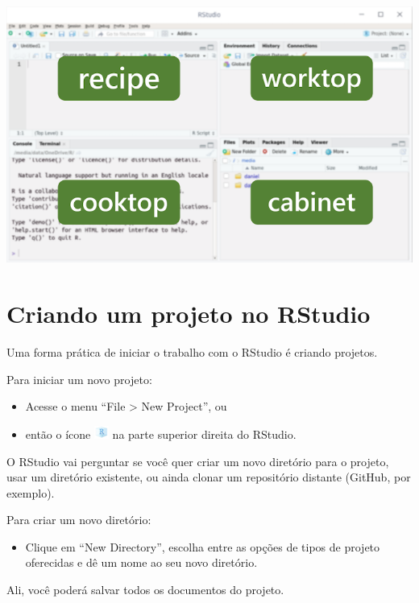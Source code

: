 \documentclass[
  10pt,
  brazil,
  a4paper,
  twoside, notitlepage, openright]{book}
\providecommand{\tightlist}{%
  \setlength{\itemsep}{0pt}\setlength{\parskip}{0pt}}
\begin{document}
\includegraphics[width=11.81in]{img/cozinha}

\hypertarget{criando-um-projeto-no-rstudio}{%
\section{Criando um projeto no RStudio}\label{criando-um-projeto-no-rstudio}}

Uma forma prática de iniciar o trabalho com o RStudio é criando projetos.

Para iniciar um novo projeto:

\begin{itemize}
\tightlist
\item
  Acesse o menu ``File \textgreater{} New Project'', ou
\item
  então o ícone \includegraphics{img/proj_ico.png} na parte superior direita do RStudio.
\end{itemize}

O RStudio vai perguntar se você quer criar um novo diretório para o projeto, usar um diretório existente, ou ainda clonar um repositório distante (GitHub, por exemplo).

Para criar um novo diretório:

\begin{itemize}
\tightlist
\item
  Clique em ``New Directory'', escolha entre as opções de tipos de projeto oferecidas e dê um nome ao seu novo diretório.
\end{itemize}

Ali, você poderá salvar todos os documentos do projeto.
\end{document}

